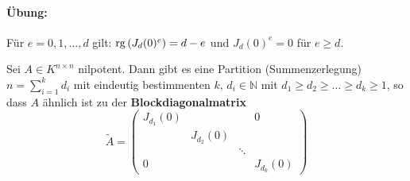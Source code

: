 \documentclass[parskip,a4paper,twoside,DIV15,BCOR12mm]{scrbook}
\begin{document}
\paragraph{\"Ubung:}{Für \(e=0,1,\ldots,d\) gilt:
\(\operatorname{rg}\left(J_{d}(0)^{e}\right)=d-e\) und 
    \(J_{d}(0)^{e}=0\) für \(e\geq d\).}
\begin{theo}
\label{Satz 14.4}
Sei \(A\in K^{n\times n}\) nilpotent. Dann gibt es eine Partition 
(Summenzerlegung) \(n=\sum_{i=1}^{k}{d_{i}}\) mit eindeutig bestimmenten 
\(k,\,d_{i}\in\mathbb{N}\) mit \(d_{1}\geq d_{2}\geq\ldots\geq d_{k}\geq1\), so
dass \(A\) ähnlich ist zu der \textbf{Blockdiagonalmatrix}
\[
\tilde{A}=\begin{pmatrix}
    J_{d_{1}}(0)&&&0\\
    &J_{d_{2}}(0)&&\\
    &&\ddots&\\
    0&&&J_{d_{k}}(0)
\end{pmatrix}
\]
\end{theo}
\end{document}
